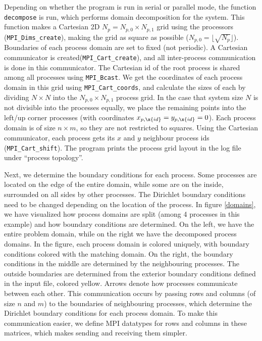 \documentclass[10pt]{article}
\begin{document}
Depending on whether the program is run in serial or parallel mode, the function \verb|decompose| is run, which performs domain decomposition for the system. This function makes a Cartesian 2D $N_p = N_{p, 0} \times N_{p, 1}$ grid using the processors (\verb|MPI_Dims_create|), making the grid as square as possible ($N_{p, 0} = \lfloor \sqrt{N_p} \rfloor$). Boundaries of each process domain are set to fixed (not periodic). A Cartesian communicator is created(\verb|MPI_Cart_create|), and all inter-process communication is done in this communicator. The Cartesian id of the root process is shared among all processes using \verb|MPI_Bcast|. We get the coordinates of each process domain in this grid using \verb|MPI_Cart_coords|, and calculate the sizes of each by dividing $N \times N$ into the $N_{p, 0} \times N_{p, 1}$ process grid. In the case that system size $N$ is not divisible into the processes equally, we place the remaining points into the left/up corner processes (with coordinates $x_{p, \x{id}} = y_{p, \x{id}} = 0$). Each process domain is of size $n \times m$, so they are not restricted to squares. Using the Cartesian communicator, each process gets its $x$ and $y$ neighbour process ids (\verb|MPI_Cart_shift|). The program prints the process grid layout in the log file under ``process topology''.

Next, we determine the boundary conditions for each process. Some processes are located on the edge of the entire domain, while some are on the inside, surrounded on all sides by other processes. The Dirichlet boundary conditions need to be changed depending on the location of the process. In figure \ref{domains}, we have visualized how process domains are split (among 4 processes in this example) and how boundary conditions are determined. On the left, we have the entire problem domain, while on the right we have the decomposed process domains. In the figure, each process domain is colored uniquely, with boundary conditions colored with the matching domain. On the right, the boundary conditions in the middle are determined by the neighbouring processes. The outside boundaries are determined from the exterior boundary conditions defined in the input file, colored yellow. Arrows denote how processes communicate between each other. This communication occurs by passing rows and columns (of size $n$ and $m$) to the boundaries of neighbouring processes, which determine the Dirichlet boundary conditions for each process domain. To make this communication easier, we define MPI datatypes for rows and columns in these matrices, which makes sending and receiving them simpler.
\end{document}
